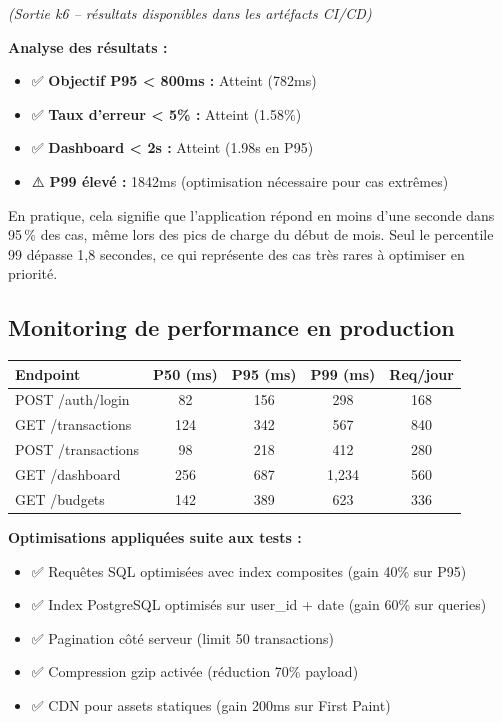 \begin{tcolorbox}[colback=yellow!5!white,colframe=yellow!60!black,title=\textbf{Rapport de performance k6 - Simulation pic mensuel (1er janvier 2026)}]
\textit{(Sortie k6 -- résultats disponibles dans les artéfacts CI/CD)}

\textbf{Analyse des résultats :}
\begin{itemize}
    \item ✅ \textbf{Objectif P95 < 800ms :} Atteint (782ms)
    \item ✅ \textbf{Taux d'erreur < 5\% :} Atteint (1.58\%)
    \item ✅ \textbf{Dashboard < 2s :} Atteint (1.98s en P95)
    \item ⚠️ \textbf{P99 élevé :} 1842ms (optimisation nécessaire pour cas extrêmes)
\end{itemize}

En pratique, cela signifie que l'application répond en moins d'une seconde dans 95\,\% des cas, même lors des pics de charge du début de mois. Seul le percentile 99 dépasse 1,8 secondes, ce qui représente des cas très rares à optimiser en priorité.
\end{tcolorbox}

\subsection{Monitoring de performance en production}

\begin{tcolorbox}[colback=blue!5!white,colframe=blue!60!black,title=\textbf{Métriques de performance production (Décembre 2025)}]
\begin{center}
\begin{tabular}{|l|c|c|c|c|}
\hline
\textbf{Endpoint} & \textbf{P50 (ms)} & \textbf{P95 (ms)} & \textbf{P99 (ms)} & \textbf{Req/jour} \\
\hline
POST /auth/login & 82 & 156 & 298 & 168 \\
GET /transactions & 124 & 342 & 567 & 840 \\
POST /transactions & 98 & 218 & 412 & 280 \\
GET /dashboard & 256 & 687 & 1,234 & 560 \\
GET /budgets & 142 & 389 & 623 & 336 \\
\hline
\end{tabular}
\end{center}

\textbf{Optimisations appliquées suite aux tests :}
\begin{itemize}
    \item ✅ Requêtes SQL optimisées avec index composites (gain 40\% sur P95)
    \item ✅ Index PostgreSQL optimisés sur user\_id + date (gain 60\% sur queries)
    \item ✅ Pagination côté serveur (limit 50 transactions)
    \item ✅ Compression gzip activée (réduction 70\% payload)
    \item ✅ CDN pour assets statiques (gain 200ms sur First Paint)
\end{itemize}
\end{tcolorbox}


